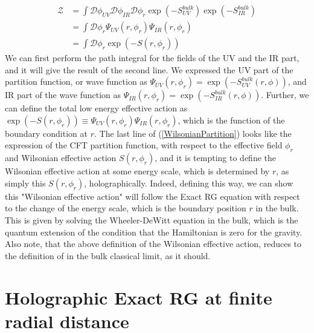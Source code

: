 \documentclass[12pt,epsbox]{article}
\numberwithin{equation}{section}
\begin{document}
 \begin{equation}
 \begin{split}
 \mathcal{Z} &= \int \mathcal{D}\phi_{UV} \mathcal{D} \phi_{IR} \mathcal{D} \phi_r \exp(-S^{bulk}_{UV}) \exp(-S^{bulk}_{IR})\\
             &= \int \mathcal{D}\phi_r \Psi_{UV}(r,\phi_r) \Psi_{IR}(r,\phi_r)\\
             &= \int \mathcal{D}\phi_r \exp(-S(r,\phi_r))\label{WilsonianPartition}
 \end{split}
 \end{equation}
 We can first perform the path integral for the fields of the UV and the IR part, and it will give the result of the second line. We expressed the UV part of the partition function, or wave function as $\Psi_{UV}(r,\phi_r)= \exp(-S^{bulk}_{UV}(r,\phi))$, and IR part of the wave function as $\Psi_{IR}(r,\phi_r)= \exp(-S^{bulk}_{IR}(r,\phi))$. Further, we can define the total low energy effective action as\\
 $\exp(-S(r,\phi_r)) \equiv \Psi_{UV}(r,\phi_r)\Psi_{IR}(r,\phi_r)$, which is the function of the boundary condition at $r$. The last line of (\ref{WilsonianPartition}) looks like the expression of the CFT partition function, with respect to the effective field $\phi_r$ and Wilsonian effective action $S(r,\phi_r)$, and it is tempting to define the Wilsonian effective action at some energy scale, which is determined by $r$, as simply this $S(r,\phi_r)$, holographically. Indeed, defining this way, we can show this "Wilsonian effective action" will follow the Exact RG equation with respect to the change of the energy scale, which is the boundary position $r$ in the bulk. This is given by solving the Wheeler-DeWitt equation in the bulk, which is the quantum extension of the condition that the Hamiltonian is zero for the gravity. Also note, that the above definition of the Wilsonian effective action, reduces to the definition of \cite{MukundHRG} in the bulk classical limit, as it should.

\section{Holographic Exact RG at finite radial distance}
\end{document}
